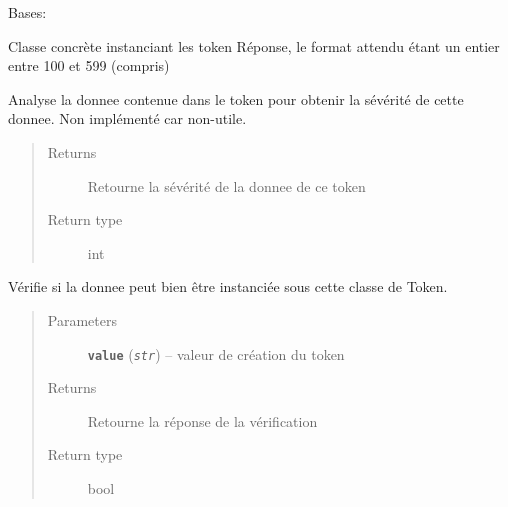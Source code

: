 \documentclass[letterpaper,10pt,english]{sphinxmanual}
\begin{document}

\begin{fulllineitems}
\label{loganalyser:loganalyser.token.Response}
Bases: {\hyperref[loganalyser:loganalyser.token.Token]{\emph{}}}

Classe concrète instanciant les token Réponse, le format attendu étant un entier entre 100 et 599 (compris)

\begin{fulllineitems}
\label{loganalyser:loganalyser.token.Response._Token__analyse}
Analyse la donnee contenue dans le token pour obtenir la sévérité de cette donnee. Non implémenté car non-utile.
\begin{quote}\begin{description}
\item[{Returns}] \leavevmode
Retourne la sévérité de la donnee de ce token

\item[{Return type}] \leavevmode
int

\end{description}\end{quote}

\end{fulllineitems}


\begin{fulllineitems}
\label{loganalyser:loganalyser.token.Response._Token__verifier_type}
Vérifie si la donnee peut bien être instanciée sous cette classe de Token.
\begin{quote}\begin{description}
\item[{Parameters}] \leavevmode
\textbf{\texttt{value}} (\emph{\texttt{str}}) -- valeur de création du token

\item[{Returns}] \leavevmode
Retourne la réponse de la vérification

\item[{Return type}] \leavevmode
bool

\end{description}\end{quote}

\end{fulllineitems}


\end{fulllineitems}
\end{document}

